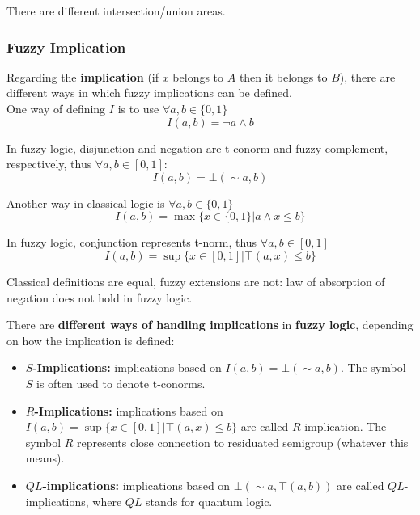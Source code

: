 \documentclass[11pt]{article}
\begin{document}
		There are different intersection/union areas.\\
		
		\newpage
		
		\subsubsection{Fuzzy Implication}
		
		Regarding the \textbf{implication} (if $x$ belongs to $A$ then it belongs to $B$), there are different ways in which fuzzy implications can be defined.\\
		
		One way of defining $I$ is to use $\forall a,b \in \{0,1\}$
		$$ I (a,b) = \neg a \wedge b $$
		
		In fuzzy logic, disjunction and negation are t-conorm and fuzzy complement, respectively, thus $\forall a,b \in [0,1]$:
		$$ I(a,b) = \bot (\sim a,b) $$
		
		Another way in classical logic is $\forall a,b \in \{0,1\}$
		$$ I (a,b) = \max \{x \in \{0,1\} | a \wedge x \leq b \} $$
		
		In fuzzy logic, conjunction represents t-norm, thus $\forall a,b \in [0,1]$
		$$ I(a,b) = \sup \{x \in [0,1] | \top (a,x) \leq b \} $$
		
		Classical definitions are equal, fuzzy extensions are not: law of absorption of negation does not hold in fuzzy logic.\\
		
		\newpage
		
		There are \textbf{different ways of handling implications} in \textbf{fuzzy logic}, depending on how the implication is defined:
		\begin{itemize}
			\item \textbf{$S$-Implications:} implications based on $I(a,b) = \bot (\sim a,b)$. The symbol $S$ is often used to denote t-conorms.\\
			
			\item \textbf{$R$-Implications:} implications based on $I(a, b) = \sup \{x \in [0, 1]| \top (a, x) \leq b\}$ are called $R$-implication. The symbol $R$ represents close connection to residuated semigroup (whatever this means).\\
			
			\item \textbf{$QL$-implications:} implications based on $\bot (\sim a, \top(a, b))$ are called $QL$-implications, where $QL$ stands for quantum logic.\\
		\end{itemize}
		
\end{document}

